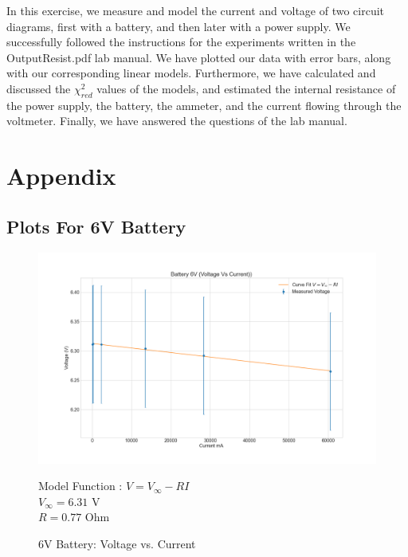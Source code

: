 \documentclass[letterpaper,12pt]{article}
\begin{document}
In this exercise, we measure and model the current and voltage of two circuit diagrams, 
first with a battery, and then later with a power supply. We successfully followed the 
instructions for the experiments written in the OutputResist.pdf lab manual. We have plotted 
our data with error bars, along with our corresponding linear models. Furthermore, 
we have calculated and discussed the $\chi_{red}^2$ values of the models, and estimated 
the internal resistance of the power supply, the battery, the ammeter, and the current 
flowing through the voltmeter. Finally, we have answered the questions of the lab manual. 

\pagebreak

\appendix

\section{Appendix}

\subsection{Plots For 6V Battery}
\begin{figure}[H]
  \centering
  \includegraphics[width=0.95\linewidth]{../code/Fredrik/6V battery lab5_voltage_vs_current.png}    
  \begin{center}
    \begin{center}
      Model Function : $V = V_{\infty} - RI$ \\
      $V_{\infty} = 6.31$ V\\
      $R = 0.77$ Ohm\\
    \end{center}  \end{center}
  \caption{6V Battery: Voltage vs. Current}
  \label{battery-v-i}
\end{figure}
\end{document}

